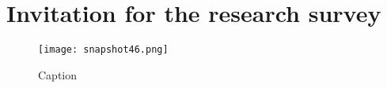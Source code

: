 \chapter{Invitation for the research survey}

\begin{figure}
\centering
\texttt{[image: snapshot46.png]}
\caption{Caption}
\label{fig:invitation}
\end{figure}
